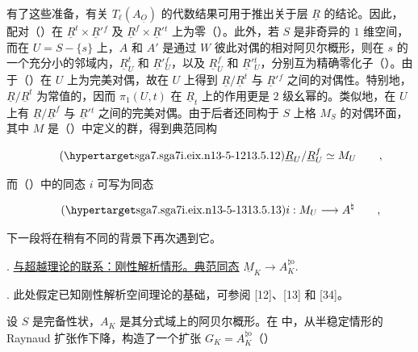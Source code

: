 \noindent
有了这些准备，有关 $T_\ell(A_{\underline O})$ 的代数结果可用于推出关于层 $\underline R$ 的结论。因此，配对（）在 $\underline R^t\times\underline R'{}^f$ 及 $\underline R^f\times\underline R'{}^t$ 上为零（）。此外，若 $S$ 是非奇异的 $1$ 维空间，而在 $U=S-\{s\}$ 上，$A$ 和 $A'$ 是通过 $W$ 彼此对偶的相对阿贝尔概形，则在 $s$ 的一个充分小的邻域内，$\underline R^t_U$ 和 $\underline R'{}^f_U$，以及 $\underline R^f_U$ 和 $\underline R'{}^t_U$，分别互为精确零化子（）。由于（）在 $U$ 上为完美对偶，故在 $U$ 上得到 $\underline R/\underline R^t$ 与 $\underline R'{}^f$ 之间的对偶性。特别地，$\underline R/\underline R^t$ 为常值的，因而 $\pi_1(U,t)$ 在 $\underline R_t$ 上的作用更是 $2$ 级幺幂的。类似地，在 $U$ 上有 $\underline R/\underline R^f$ 与 $\underline R'{}^t$ 之间的完美对偶。由于后者还同构于 $S$ 上格 $M_S$ 的对偶环面，其中 $M$ 是（）中定义的群，得到典范同构

\begin{equation}\tag{\SGARefTarget{sga7.sga7i.eix.n13-5-12}{13.5.12}}
 \underline R_U/\underline R^f_U\simeq M_U
 \qquad ,
\end{equation}

\noindent
而（）中的同态 $i$ 可写为同态

\begin{equation}\tag{\SGARefTarget{sga7.sga7i.eix.n13-5-13}{13.5.13}}
 i:M_U\longrightarrow A^\natural
 \qquad ,
\end{equation}

\noindent
下一段将在稍有不同的背景下再次遇到它。



\medskip
{}. \underline{与超越理论的联系：刚性解析情形。典范同态}
$\underline M_K\longrightarrow A_K^{\natural\mathrm o}$.

\medskip
\noindent
{}. 此处假定已知刚性解析空间理论的基础，可参阅 [12]、[13] 和 [34]。

设 $S$ 是完备性状，$A_K$ 是其分式域上的阿贝尔概形。在  中，从半稳定情形的 Raynaud 扩张作下降，构造了一个扩张 $G_K=A_K^{\natural\mathrm o}$（）

